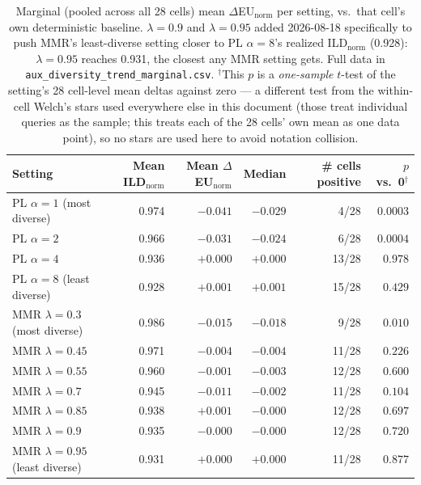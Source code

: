 \documentclass[10pt]{article}
\begin{document}
\begin{table}[h]
\centering
\small
\begin{tabular}{@{}lrrrrr@{}}
\toprule
Setting & Mean ILD$_{\text{norm}}$ & Mean $\Delta$EU$_{\text{norm}}$ & Median & \# cells positive & $p$ vs.\ 0$^\dagger$ \\
\midrule
PL $\alpha{=}1$ (most diverse)       & 0.974 & $-0.041$ & $-0.029$ & 4/28  & $0.0003$ \\
PL $\alpha{=}2$                      & 0.966 & $-0.031$ & $-0.024$ & 6/28  & $0.0004$ \\
PL $\alpha{=}4$                      & 0.936 & $+0.000$ & $+0.000$ & 13/28 & $0.978$ \\
PL $\alpha{=}8$ (least diverse)      & 0.928 & $+0.001$ & $+0.001$ & 15/28 & $0.429$ \\
\addlinespace
MMR $\lambda{=}0.3$ (most diverse)   & 0.986 & $-0.015$ & $-0.018$ & 9/28  & $0.010$ \\
MMR $\lambda{=}0.45$                 & 0.971 & $-0.004$ & $-0.004$ & 11/28 & $0.226$ \\
MMR $\lambda{=}0.55$                 & 0.960 & $-0.001$ & $-0.003$ & 12/28 & $0.600$ \\
MMR $\lambda{=}0.7$                  & 0.945 & $-0.011$ & $-0.002$ & 11/28 & $0.104$ \\
MMR $\lambda{=}0.85$                 & 0.938 & $+0.001$ & $-0.000$ & 12/28 & $0.697$ \\
MMR $\lambda{=}0.9$                  & 0.935 & $-0.000$ & $-0.000$ & 12/28 & $0.720$ \\
MMR $\lambda{=}0.95$ (least diverse) & 0.931 & $+0.000$ & $+0.000$ & 11/28 & $0.877$ \\
\bottomrule
\end{tabular}
\caption{Marginal (pooled across all 28 cells) mean $\Delta$EU$_{\text{norm}}$ per
setting, vs.\ that cell's own deterministic baseline. $\lambda{=}0.9$ and
$\lambda{=}0.95$ added 2026-08-18 specifically to push MMR's least-diverse
setting closer to PL $\alpha{=}8$'s realized ILD$_{\text{norm}}$ (0.928): $\lambda{=}0.95$
reaches 0.931, the closest any MMR setting gets. Full data in
\texttt{aux\_diversity\_trend\_marginal.csv}. $^\dagger$This $p$ is a
\emph{one-sample} $t$-test of the setting's 28 cell-level mean deltas against zero
--- a different test from the within-cell Welch's stars used everywhere else in
this document (those treat individual queries as the sample; this treats each of
the 28 cells' own mean as one data point), so no stars are used here to avoid
notation collision.}
\label{tab:diversity-trend-marginal}
\end{table}
\end{document}
